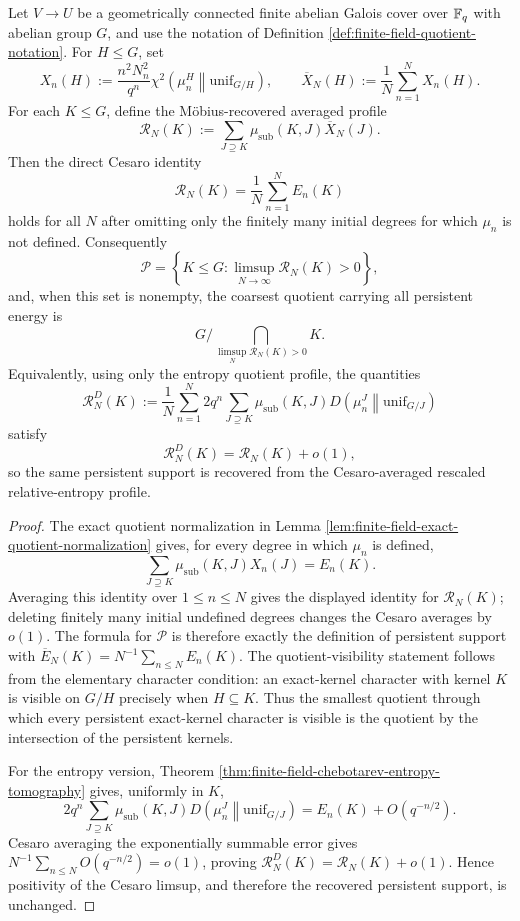 \begin{corollary}\label{cor:cesaro-averaged-quotient-profile-persistent-support}
Let \(V\to U\) be a geometrically connected finite \etale{} abelian Galois cover
over \(\mathbb{F}_q\) with abelian group \(G\), and use the notation of Definition
\ref{def:finite-field-quotient-notation}. For \(H\le G\), set
\[
X_n(H):=\frac{n^2N_n^2}{q^n}
\chi^2\!\left(\mu_n^H\middle\|\mathrm{unif}_{G/H}\right),
\qquad
\overline X_N(H):=\frac1N\sum_{n=1}^N X_n(H).
\]
For each \(K\le G\), define the M\"obius-recovered averaged profile
\[
\mathcal R_N(K):=\sum_{J\supseteq K}\mu_{\mathrm{sub}}(K,J)\overline X_N(J).
\]
Then the direct Cesaro identity
\[
\mathcal R_N(K)=\frac1N\sum_{n=1}^N E_n(K)
\]
holds for all \(N\) after omitting only the finitely many initial degrees for
which \(\mu_n\) is not defined. Consequently
\[
\mathcal P
=
\left\{K\le G:
\limsup_{N\to\infty}\mathcal R_N(K)>0\right\},
\]
and, when this set is nonempty, the coarsest quotient carrying all persistent
energy is
\[
G\Big/\bigcap_{\limsup_N\mathcal R_N(K)>0}K.
\]
Equivalently, using only the entropy quotient profile, the quantities
\[
\mathcal R_N^{D}(K):=\frac{1}{N}\sum_{n=1}^N
2q^n\sum_{J\supseteq K}\mu_{\mathrm{sub}}(K,J)
D\!\left(\mu_n^J\middle\|\mathrm{unif}_{G/J}\right)
\]
satisfy
\[
\mathcal R_N^{D}(K)=\mathcal R_N(K)+o(1),
\]
so the same persistent support is recovered from the Cesaro-averaged rescaled
relative-entropy profile.
\end{corollary}

\begin{proof}
The exact quotient normalization in Lemma
\ref{lem:finite-field-exact-quotient-normalization} gives, for every degree in
which \(\mu_n\) is defined,
\[
\sum_{J\supseteq K}\mu_{\mathrm{sub}}(K,J)X_n(J)=E_n(K).
\]
Averaging this identity over \(1\le n\le N\) gives the displayed identity for
\(\mathcal R_N(K)\); deleting finitely many initial undefined degrees changes
the Cesaro averages by \(o(1)\). The formula for \(\mathcal P\) is therefore
exactly the definition of persistent support with \(\overline E_N(K)
=N^{-1}\sum_{n\le N}E_n(K)\). The quotient-visibility statement follows from
the elementary character condition: an exact-kernel character with kernel
\(K\) is visible on \(G/H\) precisely when \(H\subseteq K\). Thus the smallest
quotient through which every persistent exact-kernel character is visible is
the quotient by the intersection of the persistent kernels.

For the entropy version, Theorem
\ref{thm:finite-field-chebotarev-entropy-tomography} gives, uniformly in
\(K\),
\[
2q^n\sum_{J\supseteq K}\mu_{\mathrm{sub}}(K,J)
D\!\left(\mu_n^J\middle\|\mathrm{unif}_{G/J}\right)
=E_n(K)+O(q^{-n/2}).
\]
Cesaro averaging the exponentially summable error gives
\(N^{-1}\sum_{n\le N}O(q^{-n/2})=o(1)\), proving
\(\mathcal R_N^D(K)=\mathcal R_N(K)+o(1)\). Hence positivity of the Cesaro
limsup, and therefore the recovered persistent support, is unchanged.
\end{proof}

